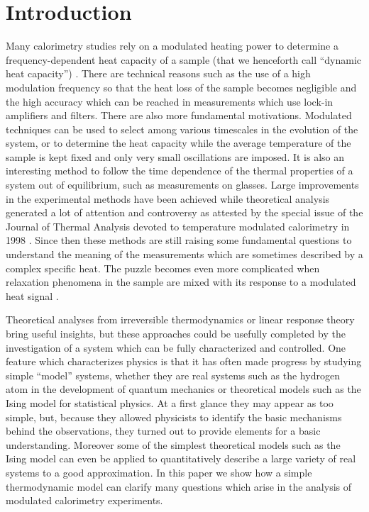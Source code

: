 \documentclass[pre,a4paper,twocolumn,superscriptaddress,%
floatfix]{revtex4}
\begin{document}
\section{Introduction}
\label{sec:intro}
Many calorimetry studies rely on a modulated heating power to determine
a frequency-dependent heat capacity of a sample
(that we henceforth call ``dynamic heat capacity'') \cite{KRAFTMAKHER}.
There are technical reasons such as the use of a
high modulation frequency so that the heat loss of the sample becomes
negligible and the high accuracy which can be reached in measurements which
use lock-in amplifiers and filters.
There are also more fundamental motivations. Modulated
techniques can be used to select among various timescales in the evolution
of the system, or to 
determine the heat capacity while the average
temperature of the sample is kept fixed and only very small oscillations are
imposed. It is also an interesting method to follow the time dependence of the
thermal properties of a system out of equilibrium, such as
measurements on glasses. Large improvements in the experimental methods have
been achieved \cite{GMELIN,HATTA} while theoretical analysis
  generated a lot of attention and controversy as attested by the special
  issue of the Journal of Thermal Analysis devoted to temperature
  modulated calorimetry in 1998 \cite{MENCZEL}.
Since then these methods are still raising
some fundamental questions \cite{GARDEN-REVIEW} to understand the meaning of
the measurements \cite{SCHAWE,READING1997}
which are sometimes described by a complex specific heat.
The puzzle becomes even
more complicated when relaxation phenomena in the sample are mixed with its
response to a modulated heat signal \cite{ANDROSCH,TOMBARI2007}.

\smallskip
Theoretical analyses from irreversible thermodynamics \cite{GARDEN-REVIEW} or
linear response theory \cite{NIELSEN} bring useful insights, but these
approaches could be usefully completed by the investigation of a system which
can be fully characterized and controlled. One feature which characterizes
physics is that it has often made progress by studying simple ``model''
systems, whether they are real systems such as the hydrogen atom in the
development of quantum mechanics or theoretical models such as the Ising model
for statistical physics.
At a first glance they may appear as too simple, but, because they allowed
physicists to identify the basic mechanisms behind the observations, they
turned out to provide elements for a basic understanding. Moreover some of the
simplest theoretical models such as the Ising model can even be applied to
quantitatively describe a large variety of real systems to a good
approximation. In this paper we show how a simple thermodynamic model can
clarify many questions which arise in the analysis of modulated calorimetry
experiments.
\end{document}
